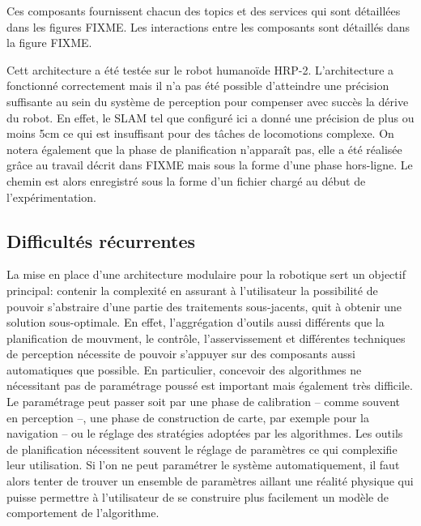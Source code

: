 Ces composants fournissent chacun des topics et des services qui sont
détaillées dans les figures FIXME. Les interactions entre les
composants sont détaillés dans la figure FIXME.


Cett architecture a été testée sur le robot humanoïde
HRP-2. L'architecture a fonctionné correctement mais il n'a pas été
possible d'atteindre une précision suffisante au sein du système de
perception pour compenser avec succès la dérive du robot. En effet, le
SLAM tel que configuré ici a donné une précision de plus ou moins 5cm
ce qui est insuffisant pour des tâches de locomotions complexe. On
notera également que la phase de planification n'apparaît pas, elle a
été réalisée grâce au travail décrit dans FIXME mais sous la forme
d'une phase hors-ligne. Le chemin est alors enregistré sous la forme
d'un fichier chargé au début de l'expérimentation.


\subsection{Difficultés récurrentes}

La mise en place d'une architecture modulaire pour la robotique sert
un objectif principal: contenir la complexité en assurant à
l'utilisateur la possibilité de pouvoir s'abstraire d'une partie des
traitements sous-jacents, quit à obtenir une solution
sous-optimale. En effet, l'aggrégation d'outils aussi différents que
la planification de mouvment, le contrôle, l'asservissement et
différentes techniques de perception nécessite de pouvoir s'appuyer
sur des composants aussi automatiques que possible. En particulier,
concevoir des algorithmes ne nécessitant pas de paramétrage poussé est
important mais également très difficile. Le paramétrage peut passer
soit par une phase de calibration -- comme souvent en perception --,
une phase de construction de carte, par exemple pour la navigation --
ou le réglage des stratégies adoptées par les algorithmes. Les outils
de planification nécessitent souvent le réglage de paramètres ce qui
complexifie leur utilisation. Si l'on ne peut paramétrer le système
automatiquement, il faut alors tenter de trouver un ensemble de
paramètres aillant une réalité physique qui puisse permettre à
l'utilisateur de se construire plus facilement un modèle de
comportement de l'algorithme.


